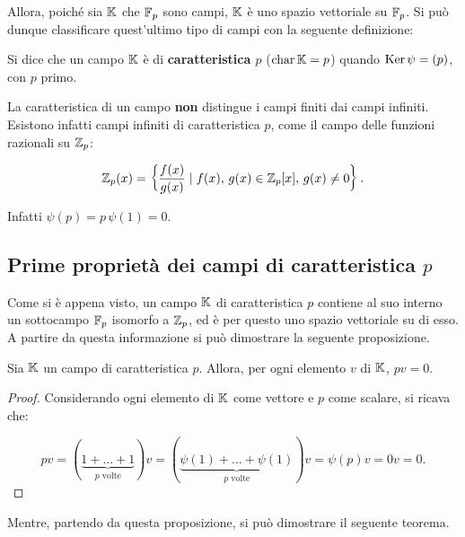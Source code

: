 Allora, poiché sia $\mathbb{K}$ che $\mathbb{F}_p$ sono campi, $\mathbb{K}$ è uno spazio
vettoriale su $\mathbb{F}_p$. Si può dunque classificare quest'ultimo tipo di
campi con la seguente definizione:

\begin{definition}
    Si dice che un campo $\mathbb{K}$ è di \textbf{caratteristica $p$} ($\operatorname{char} \mathbb{K} = p$)
    quando $\operatorname{Ker} \psi = (p)$, con $p$ primo.
\end{definition}

\begin{remark*}
    La caratteristica di un campo \textbf{non} distingue i campi finiti
    dai campi infiniti. Esistono infatti campi infiniti di caratteristica
    $p$, come il campo delle funzioni razionali su $\mathbb{Z}_p$:

    \[ \mathbb Z_p(x) =  \left\{ \frac{f(x)}{g(x)} \mid f(x),\, g(x) \in \mathbb{Z}_p[x],\, g(x) \neq 0 \right\}. \]

    \vskip 0.1in

    Infatti $\psi(p) = p \, \psi(1) = 0$.
\end{remark*}

\subsection{Prime proprietà dei campi di caratteristica \texorpdfstring{$p$}{p}}

Come si è appena visto, un campo $\mathbb{K}$ di caratteristica $p$ contiene
al suo interno un sottocampo $\mathbb{F}_p$ isomorfo a $\mathbb{Z}_p$, ed è per questo
uno spazio vettoriale su di esso. A partire da questa informazione si
può dimostrare la seguente proposizione.

\begin{proposition}
    \label{prop:campo_char_p_prodotto_per_p}
    Sia $\mathbb{K}$ un campo di caratteristica $p$. Allora, per ogni
    elemento $v$ di $\mathbb{K}$, $pv=0$.
\end{proposition}

\begin{proof}
    Considerando ogni elemento di $\mathbb{K}$ come vettore e $p$ come
    scalare, si ricava che:

    \[ pv=(\underbrace{1+\ldots+1}_{p\text{ volte}})v=
        (\underbrace{\psi(1)+\ldots+\psi(1)}_{p\text{ volte}})v=
        \psi(p)v=0v=0. \]

\end{proof}

Mentre, partendo da questa proposizione, si può dimostrare il
seguente teorema.

